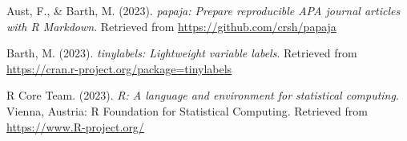 \documentclass[
  man]{apa6}
\newlength{\cslhangindent}
\newenvironment{CSLReferences}[2] %
 {\begin{list}{}{%
  \setlength{\itemindent}{0pt}
  \setlength{\leftmargin}{0pt}
  \setlength{\parsep}{0pt}
  \ifodd #1
   \setlength{\leftmargin}{\cslhangindent}
   \setlength{\itemindent}{-1\cslhangindent}
  \fi
  \setlength{\itemsep}{#2\baselineskip}}}
 {\end{list}}
\begin{document}
\label{refs}
\begin{CSLReferences}{1}{0}
Aust, F., \& Barth, M. (2023). \emph{{papaja}: {Prepare} reproducible {APA} journal articles with {R Markdown}}. Retrieved from \url{https://github.com/crsh/papaja}

Barth, M. (2023). \emph{{tinylabels}: Lightweight variable labels}. Retrieved from \url{https://cran.r-project.org/package=tinylabels}

R Core Team. (2023). \emph{R: A language and environment for statistical computing}. Vienna, Austria: R Foundation for Statistical Computing. Retrieved from \url{https://www.R-project.org/}

\end{CSLReferences}
\end{document}
